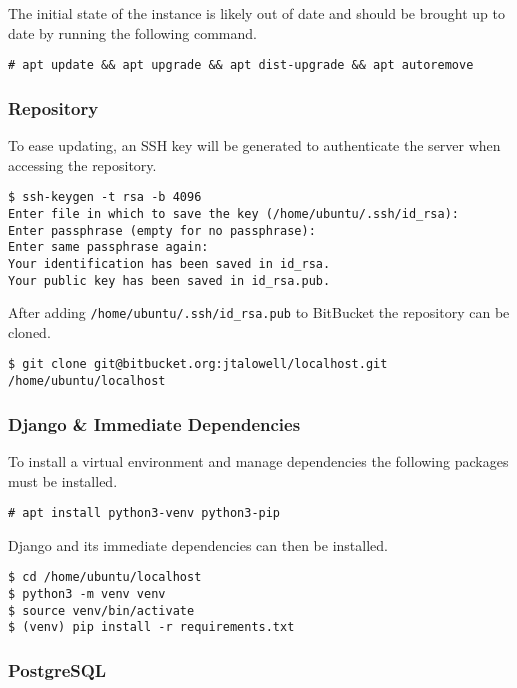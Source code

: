 The initial state of the instance is likely out of date and should be brought
up to date by running the following command.
\begin{lstlisting}
# apt update && apt upgrade && apt dist-upgrade && apt autoremove
\end{lstlisting}

\subsubsection{Repository}

To ease updating, an SSH key will be generated to authenticate the server when
accessing the repository.
\begin{lstlisting}
$ ssh-keygen -t rsa -b 4096
Enter file in which to save the key (/home/ubuntu/.ssh/id_rsa):
Enter passphrase (empty for no passphrase):
Enter same passphrase again:
Your identification has been saved in id_rsa.
Your public key has been saved in id_rsa.pub.
\end{lstlisting}
After adding \lstinline{/home/ubuntu/.ssh/id_rsa.pub} to BitBucket the
repository can be cloned.
\begin{lstlisting}
$ git clone git@bitbucket.org:jtalowell/localhost.git /home/ubuntu/localhost
\end{lstlisting}

\subsubsection{Django \& Immediate Dependencies}

To install a virtual environment and manage dependencies the following
packages must be installed.
\begin{lstlisting}
# apt install python3-venv python3-pip
\end{lstlisting}
Django and its immediate dependencies can then be installed.
\begin{lstlisting}
$ cd /home/ubuntu/localhost
$ python3 -m venv venv
$ source venv/bin/activate
$ (venv) pip install -r requirements.txt
\end{lstlisting}

\subsubsection{PostgreSQL}

